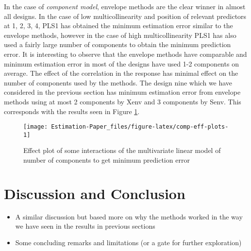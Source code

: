 \documentclass[12pt,3p,authoryear]{elsarticle}
\providecommand{\tightlist}{%
  \setlength{\itemsep}{0pt}\setlength{\parskip}{0pt}}
\begin{document}
In the case of \emph{component model}, envelope methods are the clear winner in almost all designs. In the case of low multicollinearity and position of relevant predictors at 1, 2, 3, 4, PLS1 has obtained the minimum estimation error similar to the envelope methods, however in the case of high multicollinearity PLS1 has also used a fairly large number of components to obtain the minimum prediction error. It is interesting to observe that the envelope methods have comparable and minimum estimation error in most of the designs have used 1-2 components on average. The effect of the correlation in the response has minimal effect on the number of components used by the methods. The design nine which we have considered in the previous section has minimum estimation error from envelope methods using at most 2 components by Xenv and 3 components by Senv. This corresponds with the results seen in Figure \ref{fig:comp-eff-plots}.



\begin{figure}[!htb]
\texttt{[image: Estimation-Paper\_files/figure-latex/comp-eff-plots-1]} \caption{Effect plot of some interactions of the multivariate linear model of number of components to get minimum prediction error}\label{fig:comp-eff-plots}
\end{figure}

\hypertarget{discussion-and-conclusion}{%
\section{Discussion and Conclusion}\label{discussion-and-conclusion}}

\begin{itemize}
\tightlist
\item
  A similar discussion but based more on why the methods worked in the way we have seen in the results in previous sections
\item
  Some concluding remarks and limitations (or a gate for further exploration)
\end{itemize}

\hypertarget{refs}{}


\renewcommand\refname{References}

\end{document}
